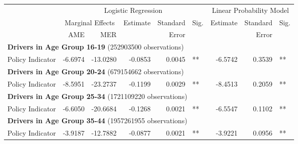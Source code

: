 
\begin{table}%
\centering 
\begin{tabular}{l r r r r l r r l} 

\hline 
 
 & \multicolumn{5}{c}{Logistic Regression}  & \multicolumn{3}{c}{Linear Probability Model} \\ 

 \cmidrule(lr){2-6}\cmidrule(lr){7-9} 
 & \multicolumn{2}{c}{Marginal Effects} & Estimate & Standard & Sig. & Estimate & Standard & Sig. \\ 

 \cmidrule(lr){2-3} 
 &   AME &  MER  &          &  Error   &      &          &  Error   &     \\ 

\hline 
 
\multicolumn{8}{l}{\textbf{Drivers in Age Group 16-19} (252903500 observations)} \\ 

Policy Indicator        &  -6.6974        &  -13.0280       &  -0.0853        &  0.0045       &   **       &  -6.5742        &  0.3539       &   **       \\ 

\hline 

\multicolumn{8}{l}{\textbf{Drivers in Age Group 20-24} (679154662 observations)} \\ 

Policy Indicator        &  -8.5951        &  -23.2737       &  -0.1199        &  0.0029       &   **       &  -8.4513        &  0.2059       &   **       \\ 

\hline 

\multicolumn{8}{l}{\textbf{Drivers in Age Group 25-34} (1721109220 observations)} \\ 

Policy Indicator        &  -6.6050        &  -20.6684       &  -0.1268        &  0.0021       &   **       &  -6.5547        &  0.1102       &   **       \\ 

\hline 

\multicolumn{8}{l}{\textbf{Drivers in Age Group 35-44} (1957261955 observations)} \\ 

Policy Indicator        &  -3.9187        &  -12.7882       &  -0.0877        &  0.0021       &   **       &  -3.9221        &  0.0956       &   **       \\ 


\end{tabular}
\end{table}
